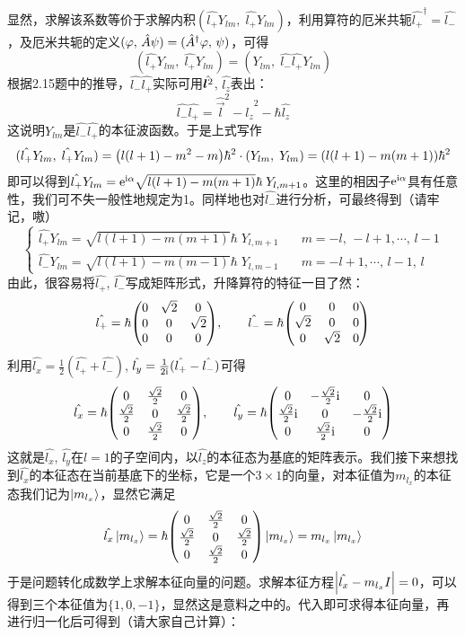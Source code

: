 \begin{enumerate}[label=2.\arabic*, leftmargin=-0.5mm]
显然，求解该系数等价于求解内积$(\hat{l_+}Y_{lm},\;\hat{l_+}Y_{lm})$，利用算符的厄米共轭$\hat{l_+}^\dagger = \hat{l_-}$，及厄米共轭的定义$(\varphi,\,\hat{A}\psi) = (\hat{A}^\dagger\varphi,\,\psi)$，可得
\[(\hat{l_+}Y_{lm},\;\hat{l_+}Y_{lm}) = (Y_{lm},\;\hat{l_-}\hat{l_+}Y_{lm})\]
根据2.15题中的推导，$\hat{l_-}\hat{l_+}$实际可用$\hat{\boldsymbol{l}^2}$, $\hat{l_z}$表出：
\[\hat{l_-}\hat{l_+}=  \hat{\vec{l}}^2-\hat{l_z}^2-\hbar \hat{l_z}\]
这说明$Y_{lm}$是$\hat{l_-}\hat{l_+}$的本征波函数。于是上式写作
\[(\hat{l_+}Y_{lm},\;\hat{l_+}Y_{lm}) = \qty(l(l+1)-m^2-m)\hbar^2\cdot(Y_{lm},\;Y_{lm}) = \qty(l(l+1)-m(m+1))\hbar^2\]
即可以得到$\hat{l_+}Y_{lm} = \mathrm{e}^{\mathrm{i} \alpha}\sqrt{l(l+1)-m(m+1)}\hbar\;Y_{l,m+1}$。这里的相因子$\mathrm{e}^{\mathrm{i}\alpha}$具有任意性，我们可不失一般性地规定为1。同样地也对$\hat{l_-}$进行分析，可最终得到（{\color{red}请牢记}，嗷）
{\color{red}\[\begin{cases}
\hat{l_+} Y_{lm} = \sqrt{l(l+1)-m(m+1)}\hbar\; Y_{l,m+1}\quad & m=-l,\,-l+1,\cdots,\,l-1\\
\hat{l_-} Y_{lm} = \sqrt{l(l+1)-m(m-1)}\hbar\; Y_{l,m-1}\quad & m=-l+1,\cdots,\,l-1,\,l
\end{cases}\]}
由此，很容易将$\hat{l_+}$, $\hat{l_-}$写成矩阵形式，升降算符的特征一目了然：
\[\hat{l_+} = \hbar\mqty(0&\sqrt{2}&0\\0&0&\sqrt{2}\\0&0&0),\qquad
\hat{l_-} = \hbar\mqty(0&0&0\\\sqrt{2}&0&0\\0&\sqrt{2}&0)
\]
利用$\hat{l_x}=\frac{1}{2}(\hat{l_+}+\hat{l_-})$, $\hat{l_y}=\frac{1}{2\mathrm{i}}(\hat{l_+}-\hat{l_-})$可得
\[\hat{l_x} = \hbar\mqty(0&\frac{\sqrt{2}}{2}&0\\\frac{\sqrt{2}}{2}&0&\frac{\sqrt{2}}{2}\\
0&\frac{\sqrt{2}}{2}&0),\qquad
\hat{l_y} = \hbar\mqty(0&-\frac{\sqrt{2}}{2}\im&0\\\frac{\sqrt{2}}{2}\im&0&-\frac{\sqrt{2}}{2}\im\\
0&\frac{\sqrt{2}}{2}\im&0)
\]
这就是$\hat{l_x}$, $\hat{l_y}$在$l=1$的子空间内，以$\hat{l_z}$的本征态为基底的矩阵表示。我们接下来想找到$\hat{l_x}$的本征态在当前基底下的坐标，它是一个$3\times1$的向量，对本征值为$m_{l_x}$的本征态我们记为$\ket{m_{l_x}}$，显然它满足
\[\hat{l_x}\ket{m_{l_x}} = 
\hbar\mqty(0&\frac{\sqrt{2}}{2}&0\\\frac{\sqrt{2}}{2}&0&\frac{\sqrt{2}}{2}\\
0&\frac{\sqrt{2}}{2}&0)\ket{m_{l_x}} = m_{l_x}\ket{m_{l_x}}\]
于是问题转化成数学上求解本征向量的问题。求解本征方程$\qty|\hat{l_x}-m_{l_x} I|=0$，可以得到三个本征值为$\{1,0,-1\}$，显然这是意料之中的。代入即可求得本征向量，再进行归一化后可得到（请大家自己计算）：

\end{enumerate}
